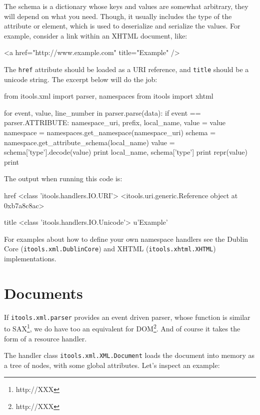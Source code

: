 The schema is a dictionary whose keys and values are somewhat arbitrary,
they will depend on what you need. Though, it usually includes the type
of the attribute or element, which is used to deserialize and serialize
the values. For example, consider a link within an XHTML document, like:

\begin{code}
    <a href="http://www.example.com" title="Example" />
\end{code}

The {\tt href} attribute should be loaded as a URI reference, and {\tt title}
should be a unicode string. The excerpt below will do the job:

\begin{code}
    from itools.xml import parser, namespaces
    from itools import xhtml

    for event, value, line_number in parser.parse(data):
        if event == parser.ATTRIBUTE:
            namespace_uri, prefix, local_name, value = value
            namespace = namespaces.get_namespace(namespace_uri)
            schema = namespace.get_attribute_schema(local_name)
            value = schema['type'].decode(value)
            print local_name, schema['type']
            print repr(value)
            print
\end{code}

The output when running this code is:

\begin{code}
    href <class 'itools.handlers.IO.URI'>
    <itools.uri.generic.Reference object at 0xb7a8c8ac>

    title <class 'itools.handlers.IO.Unicode'>
    u'Example'
\end{code}

For examples about how to define your own namespace handlers see the Dublin
Core ({\tt itools.xml.DublinCore}) and XHTML ({\tt itools.xhtml.XHTML})
implementations.


\section{Documents}

If {\tt itools.xml.parser} provides an event driven parser, whose function
is similar to SAX\footnote{http://XXX}, we do have too an equivalent for
DOM\footnote{http://XXX}. And of course it takes the form of a resource
handler.

The handler class {\tt itools.xml.XML.Document} loads the document into memory
as a tree of nodes, with some global attributes. Let's inspect an example:

